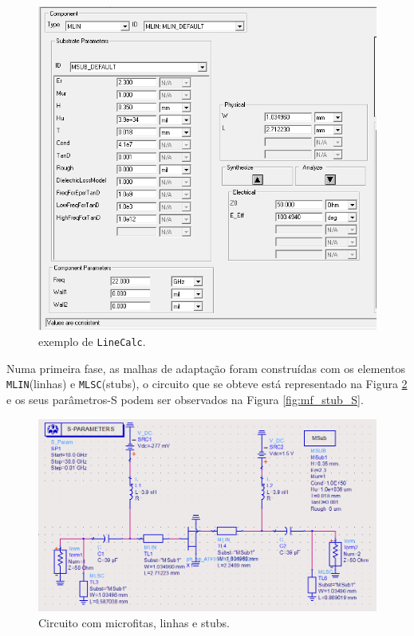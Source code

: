 \documentclass[11pt]{article}
\numberwithin{equation}{section}
\begin{document}
\begin{figure}[H]
	\centering
	\includegraphics[keepaspectratio=true, scale=0.45]{exps/LineCalc}
	\vspace{-0.5em}
	\caption{exemplo de \texttt{LineCalc}.}
	\vspace{-0.8em}
	\label{fig:LineCalc}
\end{figure}

Numa primeira fase, as malhas de adaptação foram construídas com os elementos \texttt{MLIN}(linhas) e \texttt{MLSC}(stubs), o circuito que se obteve está representado na Figura \ref{fig:mf_stub_circuito} e os seus parâmetros-S podem ser observados na Figura \ref{fig:mf_stub_S}.

\begin{figure}[H]
	\centering
	\includegraphics[keepaspectratio=true, scale=0.45]{exps/Circuito_mf_stub}
	\vspace{-0.5em}
	\caption{Circuito com microfitas, linhas e stubs.}
	\vspace{-0.8em}
	\label{fig:mf_stub_circuito}
\end{figure}
\end{document}
